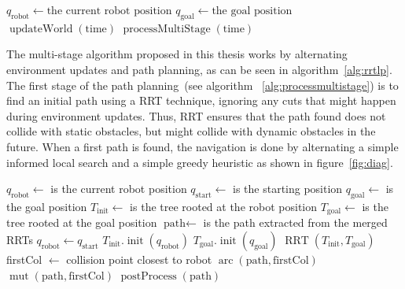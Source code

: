 \begin{algorithm}[ht]
    \caption{$\operatorname{Main}()$}
    \label{alg:rrtlp}
    \begin{algorithmic}[1]
        \STATE \(q_{\text{robot}} \leftarrow \text{the current robot position}\)
        \STATE \(q_{\text{goal}} \leftarrow \text{the goal position}\)
             \STATE \(\operatorname{updateWorld}(\text{time})\)
             \STATE \(\operatorname{processMultiStage}(\text{time})\)
        \ENDWHILE
    \end{algorithmic}
\end{algorithm}


The multi-stage algorithm proposed in this thesis works by alternating environment
updates and path planning, as can be seen in
algorithm~\ref{alg:rrtlp}. The first stage of the path planning~(see algorithm~%
\ref{alg:processmultistage})
is to find an initial path using a RRT technique, ignoring any cuts that might happen during
environment updates. Thus, RRT ensures that the path found
does not collide with static obstacles, but might collide with dynamic obstacles in the future.
When a first path is found,
the navigation is done by alternating a simple informed local search and
a simple greedy heuristic as shown in figure~\ref{fig:diag}.


\begin{algorithm}[ht]
    \caption{$\operatorname{processMultiStage}(\text{time})$}
    \label{alg:processmultistage}
    \begin{algorithmic}[1]
        \STATE $q_{\text{robot}} \leftarrow$ is the current robot position
        \STATE $q_{\text{start}} \leftarrow$ is the starting position
        \STATE $q_{\text{goal}} \leftarrow$ is the goal position
        \STATE $T_{\text{init}} \leftarrow$ is the tree rooted at the robot position
        \STATE $T_{\text{goal}} \leftarrow$ is the tree rooted at the goal position
        \STATE $\text{path} \leftarrow$ is the path extracted from the merged RRTs
        \STATE $q_{\text{robot}} \leftarrow q_{\text{start}}$
        \STATE $T_{\text{init}}.\operatorname{init}(q_{\text{robot}})$
        \STATE $T_{\text{goal}}.\operatorname{init}(q_{\text{goal}})$
                \STATE \(\operatorname{RRT}(T_{\text{init}},T_{\text{goal}})\)
            \ELSE
                    \STATE firstCol $\leftarrow$ collision point closest to robot
                    \STATE \(\operatorname{arc}(\text{path}, \text{firstCol})\)
                    \STATE \(\operatorname{mut}(\text{path}, \text{firstCol})\)
                \ENDIF
            \ENDIF
        \ENDWHILE
        \STATE \(\operatorname{postProcess}(\text{path})\)
    \end{algorithmic}
\end{algorithm}

